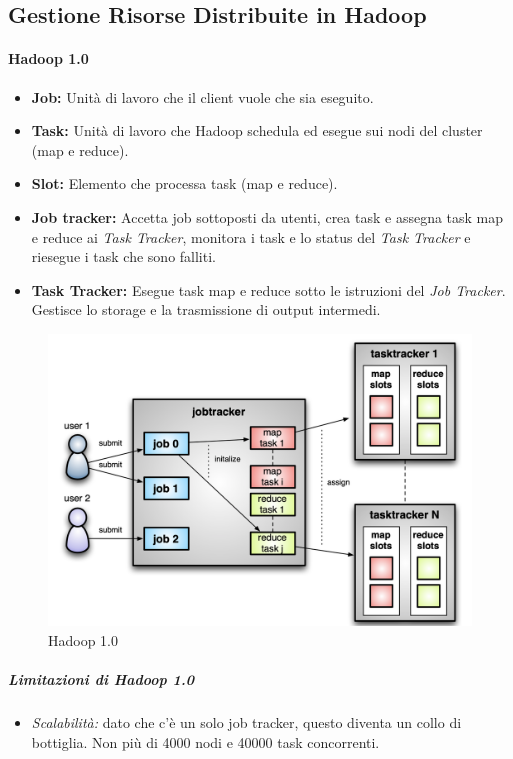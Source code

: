 \documentclass{article}
\begin{document}
\begin{appendices}
\subsection{Gestione Risorse Distribuite in Hadoop}
\paragraph{Hadoop 1.0}
\begin{itemize}
    \item \textbf{Job:} Unità di lavoro che il client vuole che sia eseguito.
    \item \textbf{Task:} Unità di lavoro che Hadoop schedula ed esegue sui nodi del cluster (map e reduce).
    \item \textbf{Slot:} Elemento che processa task (map e reduce).
    \item \textbf{Job tracker:} Accetta job sottoposti da utenti, crea task e assegna task map e reduce ai \textit{Task Tracker}, monitora i task e lo status del \textit{Task Tracker} e riesegue i task che sono falliti.
    \item \textbf{Task Tracker:} Esegue task map e reduce sotto le istruzioni del \textit{Job Tracker}. Gestisce lo storage e la trasmissione di output intermedi.
\end{itemize}
\begin{figure}[H]
    \centering
    \includegraphics[scale=0.3]{img/hadoop1.0.png}
    \caption{Hadoop 1.0}
\end{figure}\noindent
\subparagraph{Limitazioni di Hadoop 1.0} 
\begin{itemize}
    \item \textit{Scalabilità:} dato che c'è un solo job tracker, questo diventa un collo di bottiglia. Non più di 4000 nodi e 40000 task concorrenti.

\end{itemize}
\end{appendices}
\end{document}
